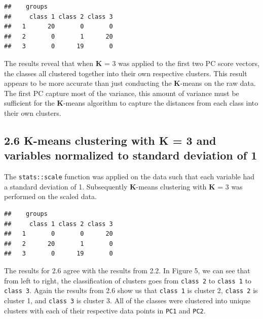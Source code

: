 \documentclass[]{article}
\newenvironment{Shaded}{\begin{snugshade}}{\end{snugshade}}
\newcommand{\KeywordTok}[1]{\textcolor[rgb]{0.13,0.29,0.53}{\textbf{{#1}}}}
\newcommand{\DataTypeTok}[1]{\textcolor[rgb]{0.13,0.29,0.53}{{#1}}}
\newcommand{\DecValTok}[1]{\textcolor[rgb]{0.00,0.00,0.81}{{#1}}}
\newcommand{\StringTok}[1]{\textcolor[rgb]{0.31,0.60,0.02}{{#1}}}
\newcommand{\OtherTok}[1]{\textcolor[rgb]{0.56,0.35,0.01}{{#1}}}
\newcommand{\NormalTok}[1]{{#1}}
\begin{document}
\begin{verbatim}
##    groups
##     class 1 class 2 class 3
##   1      20       0       0
##   2       0       1      20
##   3       0      19       0
\end{verbatim}

The results reveal that when \textbf{K} = 3 was applied to the first two
PC score vectors, the classes all clustered together into their own
respective clusters. This result appears to be more accurate than just
conducting the \textbf{K}-means on the raw data. The first PC capture
most of the variance, this amount of variance must be sufficient for the
\textbf{K}-means algorithm to capture the distances from each class into
their own clusters.

\subsection{2.6 \textbf{K}-means clustering with \textbf{K} = 3 and
variables normalized to standard deviation of
1}\label{k-means-clustering-with-k-3-and-variables-normalized-to-standard-deviation-of-1}

The \texttt{stats::scale} function was applied on the data such that
each variable had a standard deviation of 1. Subsequently
\textbf{K}-means clustering with \textbf{K} = 3 was performed on the
scaled data.

\begin{Shaded}
\end{Shaded}

\begin{verbatim}
##    groups
##     class 1 class 2 class 3
##   1       0       0      20
##   2      20       1       0
##   3       0      19       0
\end{verbatim}

The results for 2.6 agree with the results from 2.2. In Figure 5, we can
see that from left to right, the classification of clusters goes from
\texttt{class 2} to \texttt{class 1} to \texttt{class 3}. Again the
results from 2.6 show us that \texttt{class 1} is cluster 2,
\texttt{class 2} is cluster 1, and \texttt{class 3} is cluster 3. All of
the classes were clustered into unique clusters with each of their
respective data points in \texttt{PC1} and \texttt{PC2}.
\end{document}
